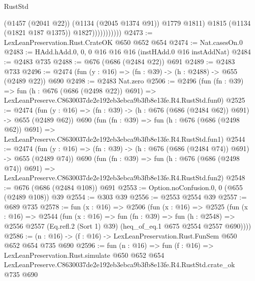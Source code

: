 \begin{lexlean}{RustStd}
\begin{coremodule}
                            (@1457 (@2041 @22))
                            (@1134 (@2045 @1374 @91))
                            @1779
                            @1811)
                          @1815
                          (@1134 (@1821 @187 @1375))
                          @1827)))))))))))
@2473 := LexLeanPreservation.Rust.CrateOK @650 @652 @654
@2474 := Nat.casesOn.{0}
@2483 := HAdd.hAdd.{0, 0, 0} @16 @16 @16 (instHAdd.{0} @16 instAddNat)
@2484 := @2483 @735
@2488 := @676 (@686 (@2484 @22)) @691
@2489 := @2483 @733
@2496 := @2474 (fun (y : @16) => (fn : @39) -> (h : @2488) -> @655 (@2489 @22)) @690
@2498 := @2483 Nat.zero
@2506 := @2496
    (fun (fn : @39) =>
    fun (h : @676 (@686 (@2498 @22)) @691) =>
    LexLeanPreserve.C8630037de2e192eb3ebca9b3fb8e13fe.R4.RustStd.fun0)
@2525 := @2474
    (fun (y : @16) => (fn : @39) -> (h : @676 (@686 (@2484 @62)) @691) -> @655 (@2489 @62))
    @690
    (fun (fn : @39) =>
    fun (h : @676 (@686 (@2498 @62)) @691) =>
    LexLeanPreserve.C8630037de2e192eb3ebca9b3fb8e13fe.R4.RustStd.fun1)
@2544 := @2474
    (fun (y : @16) => (fn : @39) -> (h : @676 (@686 (@2484 @74)) @691) -> @655 (@2489 @74))
    @690
    (fun (fn : @39) =>
    fun (h : @676 (@686 (@2498 @74)) @691) =>
    LexLeanPreserve.C8630037de2e192eb3ebca9b3fb8e13fe.R4.RustStd.fun2)
@2548 := @676 (@686 (@2484 @108)) @691
@2553 := Option.noConfusion.{0, 0} (@655 (@2489 @108)) @39
@2554 := @303 @39
@2556 := @2553 @2554 @39
@2557 := @689 @735
@2578 := fun (x : @16) =>
  @2506
    (fun (x : @16) =>
    @2525
      (fun (x : @16) =>
      @2544
        (fun (x : @16) =>
        fun (fn : @39) =>
        fun (h : @2548) =>
        @2556 @2557 (Eq.refl.{2} (Sort 1) @39) (heq_of_eq.{1} @675 @2554 @2557 @690))))
@2586 := (n : @16) -> (f : @16) -> LexLeanPreservation.Rust.FunSem @650 @652 @654 @735 @690
@2596 := fun (n : @16) =>
  fun (f : @16) =>
  LexLeanPreservation.Rust.simulate
    @650
    @652
    @654
    LexLeanPreserve.C8630037de2e192eb3ebca9b3fb8e13fe.R4.RustStd.crate_ok
    @735
    @690
\end{coremodule}
\end{lexlean}
